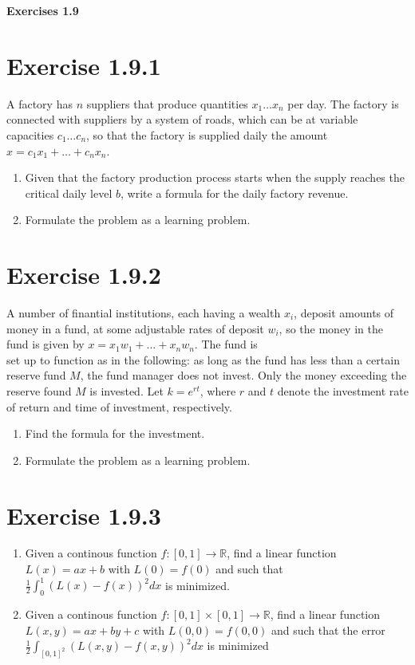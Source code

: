 \documentclass{exam}
\begin{document}
\begin{center}
    \textbf{\Large Exercises 1.9}    
\end{center}

\section*{Exercise 1.9.1}
A factory has $n$ suppliers that produce quantities $x_1 \dots x_n$ per day. The factory is connected with suppliers by a system of roads, which
can be at variable capacities $c_1 \dots c_n$, so that the factory is supplied
daily the amount $x = c_1 x_1 + \dots + c_n x_n$.
\begin{enumerate}
    \item Given that the factory production process starts when the supply reaches the critical daily level $b$, write a formula for the daily factory revenue.
    \item Formulate the problem as a learning problem.
\end{enumerate}   

\section*{Exercise 1.9.2}
A number of finantial institutions, each having a wealth $x_i$, deposit amounts of money in a fund, at some adjustable rates of 
deposit $w_i$, so the money in the fund is given by $x = x_1 w_1 + \dots + x_n w_n$. The fund is \\
set up to function as in the following: as long as the fund has less than a certain reserve fund $M$, the fund manager does not invest. Only the
money exceeding the reserve found $M$ is invested. Let $k = e ^ {r t}$, where $r$ and $t$ denote the investment rate of return and time of investment, respectively.
\begin{enumerate}
    \item Find the formula for the investment.
    \item Formulate the problem as a learning problem.
\end{enumerate}

\section*{Exercise 1.9.3}
\begin{enumerate}
    \item Given a continous function $f: [0,1] \rightarrow \mathbb{R}$, find a linear function $L(x) = ax + b$ with $L(0) = f(0)$ and such that 
    $\frac{1}{2} \int^{1}_{0}(L(x) - f(x))^2 dx$ is minimized.
    \item  Given a continous function $f: [0,1] \times [0,1] \rightarrow \mathbb{R}$, find a linear function $L(x,y) = ax + by + c$ with $L(0,0) = f(0,0)$ and 
    such that the error $\frac{1}{2} \int_{[0,1]^2}(L(x,y) - f(x,y))^2 dx$ is minimized
\end{enumerate}
\end{document}
